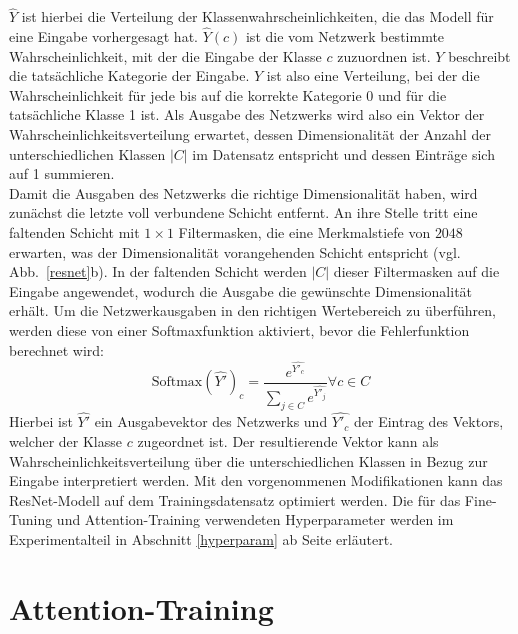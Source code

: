 $\hat{Y}$ ist hierbei die Verteilung der Klassenwahrscheinlichkeiten, die das Modell für eine Eingabe vorhergesagt hat. $\hat{Y}(c)$ ist die vom Netzwerk bestimmte Wahrscheinlichkeit, mit der die Eingabe der Klasse $c$ zuzuordnen ist. $Y$ beschreibt die tatsächliche Kategorie der Eingabe. $Y$ ist also eine Verteilung, bei der die Wahrscheinlichkeit für jede bis auf die korrekte Kategorie 0 und für die tatsächliche Klasse 1 ist. Als Ausgabe des Netzwerks wird also ein Vektor der Wahrscheinlichkeitsverteilung erwartet, dessen Dimensionalität der Anzahl der unterschiedlichen Klassen $|C|$ im Datensatz entspricht und dessen Einträge sich auf 1 summieren. \\
Damit die Ausgaben des Netzwerks die richtige Dimensionalität haben, wird zunächst die letzte voll verbundene Schicht entfernt. An ihre Stelle tritt eine faltenden Schicht mit $1\times1$ Filtermasken, die eine Merkmalstiefe von $2048$ erwarten, was der Dimensionalität vorangehenden Schicht entspricht (vgl. Abb.~\ref{resnet}b). In der faltenden Schicht werden $|C|$ dieser Filtermasken auf die Eingabe angewendet, wodurch die Ausgabe die gewünschte Dimensionalität erhält.
Um die Netzwerkausgaben in den richtigen Wertebereich zu überführen, werden diese von einer Softmaxfunktion aktiviert, bevor die Fehlerfunktion berechnet wird:
\begin{equation}
\text{Softmax}(\hat{Y'})_{c} = \frac{e^{\hat{Y'_c}}}{\sum_{ j \in C}{e^{\hat{Y'_j}}}} \forall c \in C
\end{equation}
Hierbei ist $\hat{Y'}$ ein Ausgabevektor des Netzwerks und $\hat{Y'_c}$ der Eintrag des Vektors, welcher der Klasse $c$ zugeordnet ist. Der resultierende Vektor kann als Wahrscheinlichkeitsverteilung über die unterschiedlichen Klassen in Bezug zur Eingabe interpretiert werden. Mit den vorgenommenen Modifikationen kann das ResNet-Modell auf dem Trainingsdatensatz optimiert werden. Die für das Fine-Tuning und Attention-Training verwendeten Hyperparameter werden im Experimentalteil in Abschnitt \ref{hyperparam} ab Seite \pageref{hyperparam} erläutert.

\section{Attention-Training}

